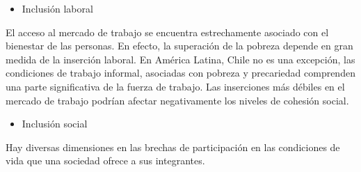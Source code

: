 \documentclass[
  12pt,
]{book}
\providecommand{\tightlist}{%
  \setlength{\itemsep}{0pt}\setlength{\parskip}{0pt}}
\begin{document}
\begin{itemize}
\tightlist
\item
  Inclusión laboral
\end{itemize}

El acceso al mercado de trabajo se encuentra estrechamente asociado con el bienestar de las personas. En efecto, la superación de la pobreza depende en gran medida de la inserción laboral. En América Latina, Chile no es una excepción, las condiciones de trabajo informal, asociadas con pobreza y precariedad comprenden una parte significativa de la fuerza de trabajo. Las inserciones más débiles en el mercado de trabajo podrían afectar negativamente los niveles de cohesión social.

\begin{itemize}
\tightlist
\item
  Inclusión social
\end{itemize}

Hay diversas dimensiones en las brechas de participación en las condiciones de vida que una sociedad ofrece a sus integrantes.
\end{document}
